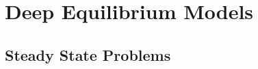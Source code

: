 \chapter{Deep Equilibrium Models}
\label{chapter:deep_equilibrium_models}

\section{Steady State Problems}
\label{sec:steady_state_problems}
